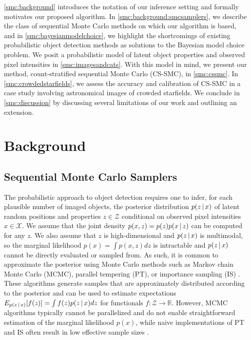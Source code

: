 \documentclass[
  12pt]{article}
\newcommand{\padvert}{\thinspace \vert \thinspace}
\begin{document}
\autoref{smc:background} introduces the notation of our inference setting and formally motivates our proposed algorithm. In \autoref{smc:background:smcsamplers}, we describe the class of sequential Monte Carlo methods on which our algorithm is based, and in \autoref{smc:bayesianmodelchoice}, we highlight the shortcomings of existing probabilistic object detection methods as solutions to the Bayesian model choice problem. We posit a probabilistic model of latent object properties and observed pixel intensities in \autoref{smc:imagesandcats}. With this model in mind, we present our method, count-stratified sequential Monte Carlo (CS-SMC), in \autoref{smc:cssmc}. In \autoref{smc:crowdedstarfields}, we assess the accuracy and calibration of CS-SMC in a case study involving astronomical images of crowded starfields. We conclude in \autoref{smc:discussion} by discussing several limitations of our work and outlining an extension.



\section{Background} \label{smc:background}

\subsection{Sequential Monte Carlo Samplers} \label{smc:background:smcsamplers}

The probabilistic approach to object detection requires one to infer, for each plausible number of imaged objects, the posterior distribution $p(z \padvert x)$ of latent random positions and properties $z \in \mathcal{Z}$ conditional on observed pixel intensities $x \in \mathcal{X}$. We assume that the joint density $p(x, z) = p(z) p(x \padvert z)$ can be computed for any $z$. We also assume that $z$ is high-dimensional and $p(z \padvert x)$ is multimodal, so the marginal likelihood $p(x) = \int p(x, z) dz$ is intractable and $p(z \padvert x)$ cannot be directly evaluated or sampled from. As such, it is common to approximate the posterior using Monte Carlo methods such as Markov chain Monte Carlo (MCMC), parallel tempering (PT), or importance sampling (IS) \citep{brooks2011handbook, geyer1991markov, neal2001annealed}. These algorithms generate samples that are approximately distributed according to the posterior and can be used to estimate expectations $E_{p(z \padvert x)}[f(z)] = \int f(z) p(z \padvert x) dz$ for functionals $f:\mathcal{Z} \rightarrow \mathbb{R}$. However, MCMC algorithms typically cannot be parallelized and do not enable straightforward estimation of the marginal likelihood $p(x)$, while naive implementations of PT and IS often result in low effective sample sizes \citep{dai2022invitation}.
\end{document}
